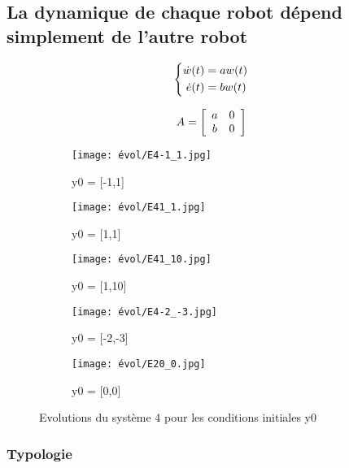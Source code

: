 \documentclass[utf8]{article}
\begin{document}
\newpage

\subsection{La dynamique de chaque robot dépend simplement de l’autre
robot}

\begin{equation}
\centering
\left\{\begin{split}
\dot{w}(t) &= aw(t) \\
\dot{e}(t) &= bw(t) \\
\end{split}\right.
 \end{equation}

\begin{equation}
\centering
A = \left[
\begin{array}{cc}
a & 0\\
b & 0
\end{array}
\right]
 \end{equation}

\begin{figure}[!htb]
\centering
\begin{subfigure}{.3\textwidth}
  \centering
  \texttt{[image: évol/E4-1\_1.jpg]}
  \caption{y0 = [-1,1]}
  \label{fig:sub1}
\end{subfigure}%
\begin{subfigure}{.3\textwidth}
  \centering
  \texttt{[image: évol/E41\_1.jpg]}
  \caption{y0 = [1,1]}
  \label{fig:sub2}
  \end{subfigure}
  \begin{subfigure}{.3\textwidth}
  \centering
  \texttt{[image: évol/E41\_10.jpg]}
  \caption{y0 = [1,10]}
  \end{subfigure}%
  \begin{subfigure}{.3\textwidth}
  \centering
  \texttt{[image: évol/E4-2\_-3.jpg]}
  \caption{y0 = [-2,-3]}
  \end{subfigure}
  \begin{subfigure}{.3\textwidth}
  \centering
  \texttt{[image: évol/E20\_0.jpg]}
  \caption{y0 = [0,0]}
  \end{subfigure}
\caption{Evolutions du système 4 pour les conditions initiales y0}
\end{figure}

\subsubsection{Typologie}
\end{document}
